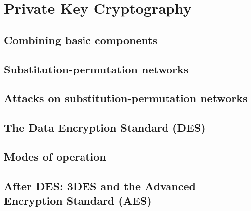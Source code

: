 \section{Private Key Cryptography}

\subsection{Combining basic components}
\subsection{Substitution-permutation networks}
\subsection{Attacks on substitution-permutation networks}
\subsection{The Data Encryption Standard (DES)}
\subsection{Modes of operation}
\subsection{After DES: 3DES and the Advanced Encryption Standard (AES)}
